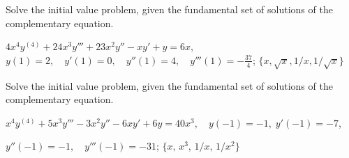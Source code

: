\documentclass{ximera}
\begin{document}
\begin{problem}\label{exer:9.4.32}
Solve the
initial value problem, given the fundamental set of solutions of the complementary equation.

$4x^4y^{(4)}+24x^3y'''+23x^2y''-xy'+y=6x$,\quad $y(1)=2,\quad
y'(1)=0,\quad y''(1)=4,\quad y'''(1)=-\frac{37}{4}$;
\quad $\{x,\sqrt x,1/x,1/\sqrt x\}$
\end{problem}

\begin{problem}\label{exer:9.4.33}
Solve the
initial value problem, given the fundamental set of solutions of the complementary equation.

$x^4y^{{(4)}}+5x^3y'''-3x^2y''-6xy'+6y=40x^3,
\quad  y(-1)=-1, \;  y'(-1)=-7$,

$y''(-1)=-1,\quad y'''(-1)=-31$;\quad
$\{x,\, x^3,\,1/x,\,1/x^2\}$
\end{problem}
\end{document}
